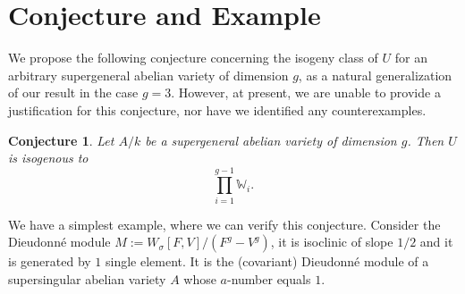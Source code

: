 \documentclass[a4paper,12pt,twoside]{report}
\newtheorem{conj}[theorem]{Conjecture}
\newcommand{\W}{\mathbb{W}}
\begin{document}
\section{Conjecture and Example}

We propose the following conjecture concerning the isogeny class of $U$ for an arbitrary supergeneral abelian variety of dimension $g$, 
as a natural generalization of our result in the case $g=3$. 
However, at present, we are unable to provide a justification for this conjecture, nor have we identified any counterexamples.

\begin{conj}\label{supergeneralconj}
    Let $A/k$ be a supergeneral abelian variety of dimension $g$. 
    Then $U$ is isogenous to \[\prod_{i=1}^{g-1} \W_{i}.\]
\end{conj}

We have a simplest example, where we can verify this conjecture.  
Consider the Dieudonné module $M:=W_{\sigma}[F,V]/(F^g-V^g)$, 
it is isoclinic of slope $1/2$ and it is generated by $1$ single element. 
It is the (covariant) Dieudonné module of a supersingular abelian variety $A$ 
whose $a$-number equals $1$. 
\end{document}

